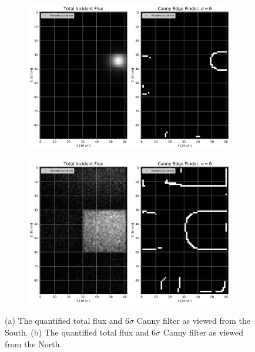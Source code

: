 \begin{figure}[!htb]
\begin{subfigure}[b]{0.5\textwidth}
   \centering
   \includegraphics[width=1\linewidth]{images/1Canny_Total_2fl_Wall_S}
   \caption{}
   \label{fig:Can2FTotS}
\end{subfigure}
\begin{subfigure}[b]{0.5\textwidth}
   \centering
   \includegraphics[width=1\linewidth]{images/1Canny_Total_2fl_Wall_N}
   \caption{}
   \label{fig:Can2FTotN}
\end{subfigure}
\caption{(a) The quantified total flux and 6$\sigma$ Canny filter as viewed from the South. (b) The quantified total flux and 6$\sigma$ Canny filter as viewed from the North.}
\end{figure}

